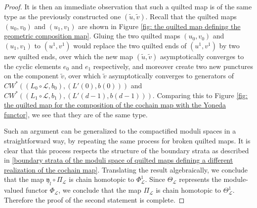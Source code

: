 \documentclass{amsart}
\numberwithin{equation}{section}
\numberwithin{figure}{section}
\begin{document}
\begin{proof}
	It is then an immediate observation that such a quilted map is of the same type as the previously constructed one $(\tilde{u}, \tilde{v})$. Recall that the quilted maps $(u_{0}, v_{0})$ and $(u_{1}, v_{1})$ are shown in Figure \ref{fig: the quilted map defining the geometric composition map}.
Gluing the two quilted maps $(u_{0}, v_{0})$ and $(u_{1}, v_{1})$ to $(u^{1}, v^{1})$ would replace the two quilted ends of $(u^{1}, v^{1})$ by two new quilted ends, over which the new map $(\tilde{u}, \tilde{v})$ asymptotically converges to the cyclic elements $e_{0}$ and $e_{1}$ respectively, and moreover create two new punctures on the component $\tilde{v}$, over which $\tilde{v}$ asymptotically converges to generators of $CW^{*}((L_{0} \circ \mathcal{L}, b_{0}), (L'(0), b(0)))$ and $CW^{*}((L_{1} \circ \mathcal{L}, b_{1}), (L'(d-1), b(d-1)))$. Comparing this to Figure \ref{fig: the quilted map for the composition of the cochain map with the Yoneda functor}, we see that they are of the same type. \par
	Such an argument can be generalized to the compactified moduli spaces in a straightforward way, by repeating the same process for broken quilted maps. It is clear that this process respects the structure of the boundary strata as described in \eqref{boundary strata of the moduli space of quilted maps defining a different realization of the cochain map}. Translating the result algebraically, we conclude that the map $\mathfrak{y}_{l} \circ \Pi_{\mathcal{L}}$ is chain homotopic to $\Phi_{\mathcal{L}}^{1}$.
Since $\Theta_{\mathcal{L}}$ represents the module-valued functor $\Phi_{\mathcal{L}}$, we conclude that the map $\Pi_{\mathcal{L}}$ is chain homotopic to $\Theta_{\mathcal{L}}^{1}$. Therefore the proof of the second statement is complete. \par
\end{proof}
\end{document}
